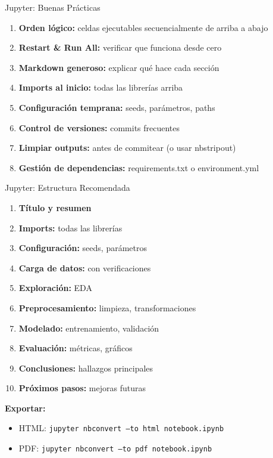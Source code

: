 \documentclass[aspectratio=169]{beamer}
\begin{document}
\begin{frame}{Jupyter: Buenas Prácticas}
\begin{enumerate}
\item \textbf{Orden lógico:} celdas ejecutables secuencialmente de arriba a abajo

\item \textbf{Restart \& Run All:} verificar que funciona desde cero

\item \textbf{Markdown generoso:} explicar qué hace cada sección

\item \textbf{Imports al inicio:} todas las librerías arriba

\item \textbf{Configuración temprana:} seeds, parámetros, paths

\item \textbf{Control de versiones:} commits frecuentes

\item \textbf{Limpiar outputs:} antes de commitear (o usar nbstripout)

\item \textbf{Gestión de dependencias:} requirements.txt o environment.yml
\end{enumerate}
\end{frame}

\begin{frame}{Jupyter: Estructura Recomendada}
\begin{enumerate}
\item \textbf{Título y resumen}
\item \textbf{Imports:} todas las librerías
\item \textbf{Configuración:} seeds, parámetros
\item \textbf{Carga de datos:} con verificaciones
\item \textbf{Exploración:} EDA
\item \textbf{Preprocesamiento:} limpieza, transformaciones
\item \textbf{Modelado:} entrenamiento, validación
\item \textbf{Evaluación:} métricas, gráficos
\item \textbf{Conclusiones:} hallazgos principales
\item \textbf{Próximos pasos:} mejoras futuras
\end{enumerate}

\vspace{0.3cm}

\textbf{Exportar:}
\begin{itemize}
\item HTML: \texttt{jupyter nbconvert --to html notebook.ipynb}
\item PDF: \texttt{jupyter nbconvert --to pdf notebook.ipynb}
\end{itemize}
\end{frame}
\end{document}
